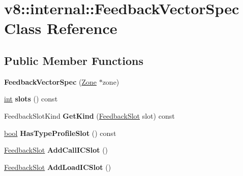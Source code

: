 \hypertarget{classv8_1_1internal_1_1FeedbackVectorSpec}{}\section{v8\+:\+:internal\+:\+:Feedback\+Vector\+Spec Class Reference}
\label{classv8_1_1internal_1_1FeedbackVectorSpec}
\subsection*{Public Member Functions}
\begin{DoxyCompactItemize}
\item 
\mbox{\label{classv8_1_1internal_1_1FeedbackVectorSpec_a05e57486e269d6a6195ff019f0885e2d}} 
{\bfseries Feedback\+Vector\+Spec} (\mbox{\hyperlink{classv8_1_1internal_1_1Zone}{Zone}} $\ast$zone)
\item 
\mbox{\label{classv8_1_1internal_1_1FeedbackVectorSpec_a29876a9d5d1c65857ede1129b0756a26}} 
\mbox{\hyperlink{classint}{int}} {\bfseries slots} () const
\item 
\mbox{\label{classv8_1_1internal_1_1FeedbackVectorSpec_a2232b4795a9741952841d6b938f32b04}} 
Feedback\+Slot\+Kind {\bfseries Get\+Kind} (\mbox{\hyperlink{classv8_1_1internal_1_1FeedbackSlot}{Feedback\+Slot}} slot) const
\item 
\mbox{\label{classv8_1_1internal_1_1FeedbackVectorSpec_a5a385c0a18795977c391b1f871b85937}} 
\mbox{\hyperlink{classbool}{bool}} {\bfseries Has\+Type\+Profile\+Slot} () const
\item 
\mbox{\label{classv8_1_1internal_1_1FeedbackVectorSpec_a2736840b2f84ae481bfee6308b36bab3}} 
\mbox{\hyperlink{classv8_1_1internal_1_1FeedbackSlot}{Feedback\+Slot}} {\bfseries Add\+Call\+I\+C\+Slot} ()
\item 
\mbox{\label{classv8_1_1internal_1_1FeedbackVectorSpec_a56bcedafe3bc11216328bcd2f444e959}} 
\mbox{\hyperlink{classv8_1_1internal_1_1FeedbackSlot}{Feedback\+Slot}} {\bfseries Add\+Load\+I\+C\+Slot} ()

\end{DoxyCompactItemize}
